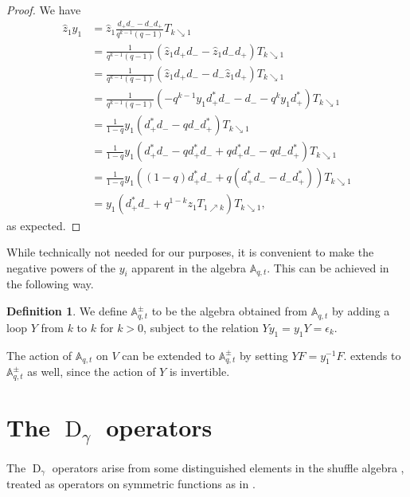 \documentclass[reqno]{amsart}
\theoremstyle{plain}
\theoremstyle{definition}
\newtheorem{definition}[theorem]{Definition}
\theoremstyle{remark}
\DeclareMathOperator{\D}{D}
\newcommand{\A}{\mathbb{A}}%
\newcommand{\z}{\widehat{z}}
\newcommand{\<}{\langle}
\renewcommand{\>}{\rangle}
\begin{document}
\begin{proof}
    We have
    \begin{align*}
        \z_1 y_1 & = \z_1 \frac{d_+ d_- - d_- d_+}{q^{k-1}(q-1)} T_{k \searrow 1} \\
        & = \frac{1}{q^{k-1} (q-1)} \left( \z_1 d_+ d_- - \z_1 d_- d_+ \right) T_{k \searrow 1} \\
        & = \frac{1}{q^{k-1} (q-1)} \left( \z_1 d_+ d_- - d_- \z_1 d_+ \right) T_{k \searrow 1}\\
        & = \frac{1}{q^{k-1} (q-1)} \left( -q^{k-1} y_1 d_+^* d_- - d_- -q^{k} y_1 d_+^* \right) T_{k \searrow 1}\\
        & = \frac{1}{1-q} y_1 \left( d_+^* d_- - q d_- d_+^* \right) T_{k \searrow 1}\\
        & = \frac{1}{1-q} y_1 \left( d_+^* d_- - q d_+^* d_- + q d_+^* d_- - q d_- d_+^* \right) T_{k \searrow 1}\\
        & = \frac{1}{1-q} y_1 \left( (1-q) d_+^* d_- + q (d_+^* d_- - d_- d_+^*) \right) T_{k \searrow 1}\\
        & = y_1 (d_+^* d_- + q^{1-k} z_1 T_{1 \nearrow k}) T_{k \searrow 1},
    \end{align*}
    as expected.
\end{proof}

While technically not needed for our purposes, it is convenient to make the negative powers of the $y_i$ apparent in the algebra $\A_{q,t}$. This can be achieved in the following way.

\begin{definition}
    \label{def:Aqt_Y}
    We define $\A_{q,t}^\pm$ to be the algebra obtained from $\A_{q,t}$ by adding a loop $Y$ from $k$ to $k$ for $k > 0$, subject to the relation $Y y_1 = y_1 Y = \epsilon_k$.
\end{definition}

The action of $\A_{q,t}$ on $V$ can be extended to $\A_{q,t}^{\pm}$ by setting $Y F = y_1^{-1} F$. 
 extends to $\A_{q,t}^\pm$ as well, since the action of $Y$ is invertible.

\section{The \texorpdfstring{$\D_\gamma$}{Dgamma} operators}
\label{sec:Dgamma}

The $\D_\gamma$ operators arise from some distinguished elements in the shuffle algebra \cite[Proposition~6.1]{Negut2014ShuffleAlgebra}, treated as operators on symmetric functions as in \cite[Equation~(52)]{BHMPS2023ShuffleAnyLine}.
\end{document}
